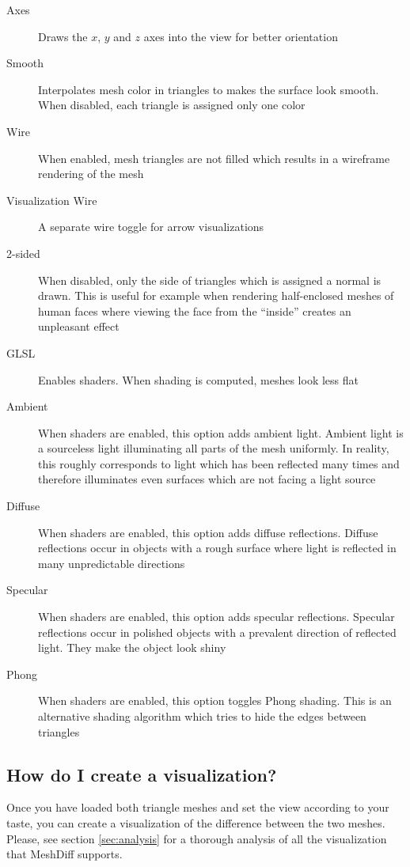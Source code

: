 \begin{description}
\item [Axes] Draws the \(x\), \(y\) and \(z\) axes into the view for better orientation
\item [Smooth] Interpolates mesh color in triangles to makes the surface look smooth. When disabled, each triangle is assigned only one color
\item [Wire] When enabled, mesh triangles are not filled which results in a wireframe rendering of the mesh
\item [Visualization Wire] A separate wire toggle for arrow visualizations
\item [2-sided] When disabled, only the side of triangles which is assigned a normal is drawn. This is useful for example when rendering half-enclosed meshes of human faces where viewing the face from the ``inside'' creates an unpleasant effect
\item [GLSL] Enables shaders. When shading is computed, meshes look less flat
\item [Ambient] When shaders are enabled, this option adds ambient light. Ambient light is a sourceless light illuminating all parts of the mesh uniformly. In reality, this roughly corresponds to light which has been reflected many times and therefore illuminates even surfaces which are not facing a light source 
\item [Diffuse] When shaders are enabled, this option adds diffuse reflections. Diffuse reflections occur in objects with a rough surface where light is reflected in many unpredictable directions
\item [Specular] When shaders are enabled, this option adds specular reflections. Specular reflections occur in polished objects with a prevalent direction of reflected light. They make the object look shiny
\item [Phong] When shaders are enabled, this option toggles Phong shading. This is an alternative shading algorithm which tries to hide the edges between triangles
\end{description}

\subsection{How do I create a visualization?}

Once you have loaded both triangle meshes and set the view according to your taste, you can create a visualization of the difference between the two meshes. Please, see section \ref{sec:analysis} for a thorough analysis of all the visualization that MeshDiff supports.

